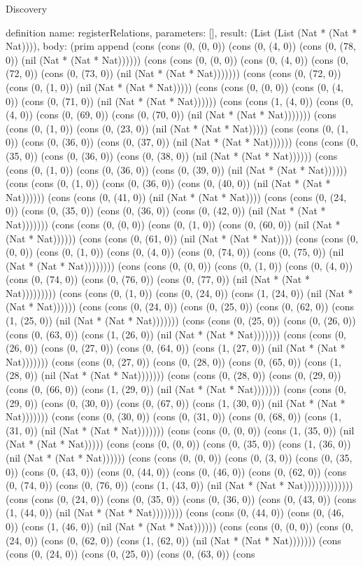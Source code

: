\begin{lexlean}{Discovery}
\begin{semanticmodule}
definition{
  name: registerRelations,
  parameters: [],
  result: (List (List (Nat * (Nat * Nat)))),
  body: (prim append (cons (cons (0, (0, 0)) (cons (0, (4, 0)) (cons (0, (78, 0)) (nil (Nat * (Nat * Nat)))))) (cons (cons (0, (0, 0)) (cons (0, (4, 0)) (cons (0, (72, 0)) (cons (0, (73, 0)) (nil (Nat * (Nat * Nat))))))) (cons (cons (0, (72, 0)) (cons (0, (1, 0)) (nil (Nat * (Nat * Nat))))) (cons (cons (0, (0, 0)) (cons (0, (4, 0)) (cons (0, (71, 0)) (nil (Nat * (Nat * Nat)))))) (cons (cons (1, (4, 0)) (cons (0, (4, 0)) (cons (0, (69, 0)) (cons (0, (70, 0)) (nil (Nat * (Nat * Nat))))))) (cons (cons (0, (1, 0)) (cons (0, (23, 0)) (nil (Nat * (Nat * Nat))))) (cons (cons (0, (1, 0)) (cons (0, (36, 0)) (cons (0, (37, 0)) (nil (Nat * (Nat * Nat)))))) (cons (cons (0, (35, 0)) (cons (0, (36, 0)) (cons (0, (38, 0)) (nil (Nat * (Nat * Nat)))))) (cons (cons (0, (1, 0)) (cons (0, (36, 0)) (cons (0, (39, 0)) (nil (Nat * (Nat * Nat)))))) (cons (cons (0, (1, 0)) (cons (0, (36, 0)) (cons (0, (40, 0)) (nil (Nat * (Nat * Nat)))))) (cons (cons (0, (41, 0)) (nil (Nat * (Nat * Nat)))) (cons (cons (0, (24, 0)) (cons (0, (35, 0)) (cons (0, (36, 0)) (cons (0, (42, 0)) (nil (Nat * (Nat * Nat))))))) (cons (cons (0, (0, 0)) (cons (0, (1, 0)) (cons (0, (60, 0)) (nil (Nat * (Nat * Nat)))))) (cons (cons (0, (61, 0)) (nil (Nat * (Nat * Nat)))) (cons (cons (0, (0, 0)) (cons (0, (1, 0)) (cons (0, (4, 0)) (cons (0, (74, 0)) (cons (0, (75, 0)) (nil (Nat * (Nat * Nat)))))))) (cons (cons (0, (0, 0)) (cons (0, (1, 0)) (cons (0, (4, 0)) (cons (0, (74, 0)) (cons (0, (76, 0)) (cons (0, (77, 0)) (nil (Nat * (Nat * Nat))))))))) (cons (cons (0, (1, 0)) (cons (0, (24, 0)) (cons (1, (24, 0)) (nil (Nat * (Nat * Nat)))))) (cons (cons (0, (24, 0)) (cons (0, (25, 0)) (cons (0, (62, 0)) (cons (1, (25, 0)) (nil (Nat * (Nat * Nat))))))) (cons (cons (0, (25, 0)) (cons (0, (26, 0)) (cons (0, (63, 0)) (cons (1, (26, 0)) (nil (Nat * (Nat * Nat))))))) (cons (cons (0, (26, 0)) (cons (0, (27, 0)) (cons (0, (64, 0)) (cons (1, (27, 0)) (nil (Nat * (Nat * Nat))))))) (cons (cons (0, (27, 0)) (cons (0, (28, 0)) (cons (0, (65, 0)) (cons (1, (28, 0)) (nil (Nat * (Nat * Nat))))))) (cons (cons (0, (28, 0)) (cons (0, (29, 0)) (cons (0, (66, 0)) (cons (1, (29, 0)) (nil (Nat * (Nat * Nat))))))) (cons (cons (0, (29, 0)) (cons (0, (30, 0)) (cons (0, (67, 0)) (cons (1, (30, 0)) (nil (Nat * (Nat * Nat))))))) (cons (cons (0, (30, 0)) (cons (0, (31, 0)) (cons (0, (68, 0)) (cons (1, (31, 0)) (nil (Nat * (Nat * Nat))))))) (cons (cons (0, (0, 0)) (cons (1, (35, 0)) (nil (Nat * (Nat * Nat))))) (cons (cons (0, (0, 0)) (cons (0, (35, 0)) (cons (1, (36, 0)) (nil (Nat * (Nat * Nat)))))) (cons (cons (0, (0, 0)) (cons (0, (3, 0)) (cons (0, (35, 0)) (cons (0, (43, 0)) (cons (0, (44, 0)) (cons (0, (46, 0)) (cons (0, (62, 0)) (cons (0, (74, 0)) (cons (0, (76, 0)) (cons (1, (43, 0)) (nil (Nat * (Nat * Nat))))))))))))) (cons (cons (0, (24, 0)) (cons (0, (35, 0)) (cons (0, (36, 0)) (cons (0, (43, 0)) (cons (1, (44, 0)) (nil (Nat * (Nat * Nat)))))))) (cons (cons (0, (44, 0)) (cons (0, (46, 0)) (cons (1, (46, 0)) (nil (Nat * (Nat * Nat)))))) (cons (cons (0, (0, 0)) (cons (0, (24, 0)) (cons (0, (62, 0)) (cons (1, (62, 0)) (nil (Nat * (Nat * Nat))))))) (cons (cons (0, (24, 0)) (cons (0, (25, 0)) (cons (0, (63, 0)) (cons }
\end{semanticmodule}
\end{lexlean}
